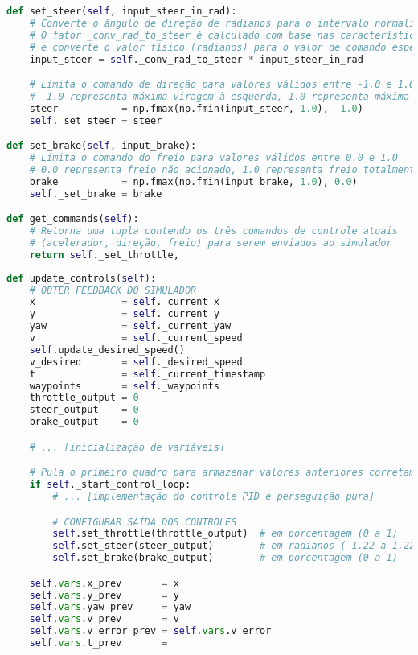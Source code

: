 \documentclass[
	12pt,				%
	oneside, %
	a4paper,			%
	english,			%
	french,				%
	spanish,			%
	brazil				%
	]{abntex2}
\begin{document}
\begin{apendicesenv}
\begin{lstlisting}[language=Python, caption=Métodos para definição dos comandos de controle., label=lst:command-setting]
def set_steer(self, input_steer_in_rad):
    # Converte o ângulo de direção de radianos para o intervalo normalizado [-1, 1]
    # O fator _conv_rad_to_steer é calculado com base nas características físicas do veículo
    # e converte o valor físico (radianos) para o valor de comando esperado pelo simulador
    input_steer = self._conv_rad_to_steer * input_steer_in_rad

    # Limita o comando de direção para valores válidos entre -1.0 e 1.0
    # -1.0 representa máxima viragem à esquerda, 1.0 representa máxima viragem à direita
    steer           = np.fmax(np.fmin(input_steer, 1.0), -1.0)
    self._set_steer = steer

def set_brake(self, input_brake):
    # Limita o comando do freio para valores válidos entre 0.0 e 1.0
    # 0.0 representa freio não acionado, 1.0 representa freio totalmente acionado
    brake           = np.fmax(np.fmin(input_brake, 1.0), 0.0)
    self._set_brake = brake

def get_commands(self):
    # Retorna uma tupla contendo os três comandos de controle atuais
    # (acelerador, direção, freio) para serem enviados ao simulador
    return self._set_throttle,
\end{lstlisting}


\begin{lstlisting}[language=Python, caption=Método principal de atualização do controlador., label=lst:update-controls]
def update_controls(self):
    # OBTER FEEDBACK DO SIMULADOR
    x               = self._current_x
    y               = self._current_y
    yaw             = self._current_yaw
    v               = self._current_speed
    self.update_desired_speed()
    v_desired       = self._desired_speed
    t               = self._current_timestamp
    waypoints       = self._waypoints
    throttle_output = 0
    steer_output    = 0
    brake_output    = 0

    # ... [inicialização de variáveis]

    # Pula o primeiro quadro para armazenar valores anteriores corretamente
    if self._start_control_loop:
        # ... [implementação do controle PID e perseguição pura]

        # CONFIGURAR SAÍDA DOS CONTROLES
        self.set_throttle(throttle_output)  # em porcentagem (0 a 1)
        self.set_steer(steer_output)        # em radianos (-1.22 a 1.22)
        self.set_brake(brake_output)        # em porcentagem (0 a 1)

    self.vars.x_prev       = x
    self.vars.y_prev       = y
    self.vars.yaw_prev     = yaw
    self.vars.v_prev       = v
    self.vars.v_error_prev = self.vars.v_error
    self.vars.t_prev       =
\end{lstlisting}



\end{apendicesenv}
\end{document}
